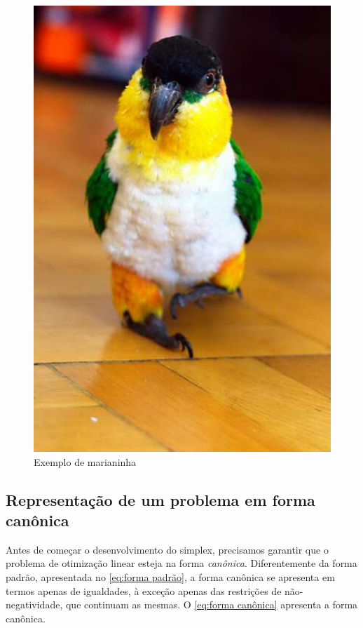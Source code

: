 \begin{figure}[h!]
    \centering
    \caption{Exemplo de marianinha \cite{BÉKÉSI:09}}
    \includegraphics[scale=0.5]{imagens/marianinha.pdf}
\end{figure}


\subsection{Representação de um problema em forma canônica}\label{sec:forma canônica}

Antes de começar o desenvolvimento do simplex, precisamos garantir que o problema de otimização linear esteja na forma \emph{canônica}. Diferentemente da forma padrão, apresentada no \cref{eq:forma padrão}, a forma canônica se apresenta em termos apenas de igualdades, à exceção apenas das restrições de não-negatividade, que continuam as mesmas. O \cref{eq:forma canônica} apresenta a forma canônica.

